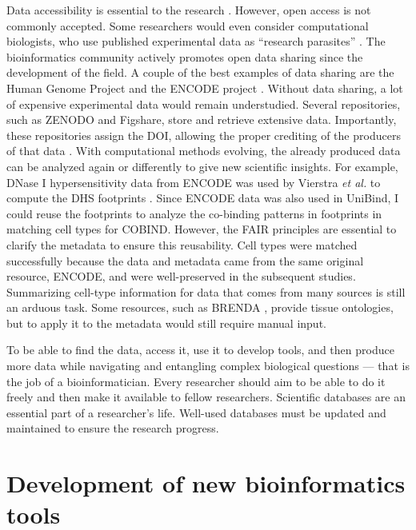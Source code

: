     Data accessibility is essential to the research \cite{tedersoo2021data}. However, open access is not commonly accepted. Some researchers would even consider computational biologists, who use published experimental data as ``research parasites'' \cite{longo2016data}. The bioinformatics community actively promotes open data sharing since the development of the field. A couple of the best examples of data sharing are the Human Genome Project and the ENCODE project \cite{international2001initial,encode2012integrated}. Without data sharing, a lot of expensive experimental data would remain understudied. Several repositories, such as ZENODO and Figshare, store and retrieve extensive data. Importantly, these repositories assign the \ac{DOI}, allowing the proper crediting of the producers of that data \cite{zenodo,singh2011figshare}. With computational methods evolving, the already produced data can be analyzed again or differently to give new scientific insights. For example, DNase I hypersensitivity data from ENCODE was used by Vierstra \textit{et al.} to compute the DHS footprints \cite{vierstra2020global}. Since ENCODE data was also used in UniBind, I could reuse the footprints to analyze the co-binding patterns in footprints in matching cell types for COBIND. However, the FAIR principles are essential to clarify the metadata to ensure this reusability. Cell types were matched successfully because the data and metadata came from the same original resource, ENCODE, and were well-preserved in the subsequent studies. Summarizing cell-type information for data that comes from many sources is still an arduous task. Some resources, such as BRENDA \cite{gremse2010brenda}, provide tissue ontologies, but to apply it to the metadata would still require manual input.

    To be able to find the data, access it, use it to develop tools, and then produce more data while navigating and entangling complex biological questions --- that is the job of a bioinformatician. Every researcher should aim to be able to do it freely and then make it available to fellow researchers. Scientific databases are an essential part of a researcher's life. Well-used databases must be updated and maintained to ensure the research progress.

    \section{Development of new bioinformatics tools}

